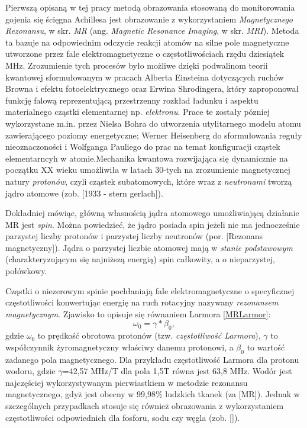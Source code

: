 Pierwszą opisaną w tej pracy metodą obrazowania stosowaną do monitorowania gojenia się ścięgna Achillesa jest obrazowanie z wykorzystaniem \textit{Magnetycznego Rezonansu}, w skr. \textit{MR} (ang. \textit{Magnetic Resonance Imaging}, w skr. \textit{MRI}). Metoda ta bazuje na odpowiednim odczycie reakcji atomów na silne pole magnetyczne utworzone przez fale elektromagnetyczne o częstotliwościach rzędu dziesiątek MHz. Zrozumienie tych procesów było możliwe dzięki podwalinom teorii kwantowej sformułowanym w pracach Alberta Einsteina dotyczących ruchów Browna i efektu fotoelektrycznego oraz Erwina Shrodingera, który zaproponował funkcję falową reprezentującą przestrzenny rozkład ładunku i aspektu materialnego cząstki elementarnej np. \textit{elektronu}. Prace te zostały pózniej wykorzystane m.in. przez Nielsa Bohra do utworzenia utylitarnego modelu atomu zawierającego poziomy energetyczne; Werner Heisenberg do sformułowania reguły nieoznaczoności i Wolfganga Pauliego do prac na temat konfiguracji cząstek elementarncyh w atomie.Mechanika kwantowa rozwijająca się dynamicznie na początku XX wieku umożliwiła w latach 30-tych na zrozumienie magnetycznej natury \textit{protonów}, czyli cząstek subatomowych, które wraz z \textit{neutronami} tworzą jądro atomowe (zob. [1933 - stern gerlach]). 

Dokładniej mówiąc, główną własnością jądra atomowego umożliwiającą działanie MR jest \textit{spin}. Można powiedzieć, że jądro posiada spin jeżeli nie ma jednocześnie parzystej liczby protonów i parzystej liczby neutronów (por. [Rezonans magnetyczny]). Jądra o parzystej liczbie atomowej mają w \textit{stanie podstawowym} (charakteryzującym się najniższą energią) spin całkowity, a o nieparzystej, połówkowy.

Cząstki o niezerowym spinie pochłaniają fale elektromagnetyczne o specyficznej częstotliwości konwertując energię na ruch rotacyjny nazywany \textit{rezonansem magnetycznym}. Zjawisko to opisuje się równaniem Larmora \ref{MRLarmor}:
\begin{equation}
\label{MRLarmor}
\omega_0 = \gamma \ast \beta_0,
\end{equation}
gdzie $\omega_0$ to prędkość obrotowa protonów (tzw. \textit{częstotliwość Larmora}), $\gamma$ to współczynnik żyromagnetyczny właściwy danemu protonowi, a $\beta_0$ to wartość zadanego pola magnetycznego. Dla przykładu częstotliwość Larmora dla protonu wodoru, gdzie $\gamma$=42,57 MHz/T dla pola 1,5T równa jest 63,8 MHz. Wodór jest najczęściej wykorzystywanym pierwiastkiem w metodzie rezonansu magnetycznego, gdyż jest obecny w 99,98\% ludzkich tkanek (za [MR]). Jednak w szczególnych przypadkach stosuje się również obrazowania z wykorzystaniem częstotliwości odpowiednich dla fosforu, sodu czy węgla (zob. []).

